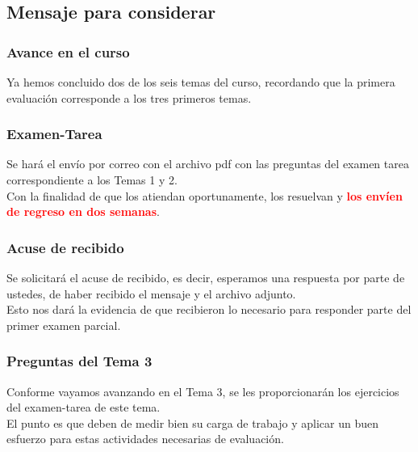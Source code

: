 \subsection{Mensaje para considerar}
\begin{frame}
\frametitle{Avance en el curso}
Ya hemos concluido dos de los seis temas del curso, recordando que la primera evaluación corresponde a los tres primeros temas.
\end{frame}
\begin{frame}
\frametitle{Examen-Tarea}
Se hará el envío por correo con el archivo pdf con las preguntas del examen tarea correspondiente a los Temas 1 y 2.
\\
\bigskip
\pause
Con la finalidad de que los atiendan oportunamente, los resuelvan y \textbf{\textcolor{red}{los envíen de regreso en dos semanas}}.
\end{frame}
\begin{frame}
\frametitle{Acuse de recibido}
Se solicitará el acuse de recibido, es decir, esperamos una respuesta por parte de ustedes, de haber recibido el mensaje y el archivo adjunto.
\\
\bigskip
\pause
Esto nos dará la evidencia de que recibieron lo necesario para responder parte del primer examen parcial.
\end{frame}
\begin{frame}
\frametitle{Preguntas del Tema 3}
Conforme vayamos avanzando en el Tema 3, se les proporcionarán los ejercicios del examen-tarea de este tema.
\\
\bigskip
\pause
El punto es que deben de medir bien su carga de trabajo y aplicar un buen esfuerzo para estas actividades necesarias de evaluación.
\end{frame}
